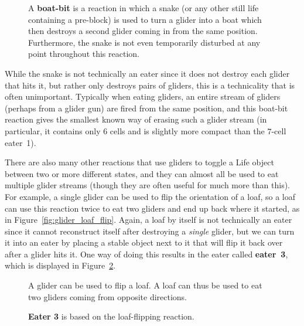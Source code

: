 \begin{figure}[!htb]
	\centering
	\caption{A \textbf{boat-bit} is a reaction in which a snake (or any other still life containing a pre-block) is used to turn a glider into a boat which then destroys a second glider coming in from the same position. Furthermore, the snake is not even temporarily disturbed at any point throughout this reaction.}\label{fig:boat_bit}
\end{figure}

While the snake is not technically an eater since it does not destroy each glider that hits it, but rather only destroys pairs of gliders, this is a technicality that is often unimportant. Typically when eating gliders, an entire stream of gliders (perhaps from a glider gun) are fired from the same position, and this boat-bit reaction gives the smallest known way of erasing such a glider stream (in particular, it contains only $6$ cells and is slightly more compact than the $7$-cell eater~1).

There are also many other reactions that use gliders to toggle a Life object between two or more different states, and they can almost all be used to eat multiple glider streams (though they are often useful for much more than this). For example, a single glider can be used to flip the orientation of a loaf, so a loaf can use this reaction twice to eat two gliders and end up back where it started, as in Figure~\ref{fig:glider_loaf_flip}. Again, a loaf by itself is not technically an eater since it cannot reconstruct itself after destroying a \emph{single} glider, but we can turn it into an eater by placing a stable object next to it that will flip it back over after a glider hits it. One way of doing this results in the eater called \textbf{eater~3}, which is displayed in Figure~\ref{fig:eater_3}.

\begin{figure}[!htb]
	\centering
	\begin{minipage}{.61\textwidth}
		\centering
		\caption{A glider can be used to flip a loaf. A loaf can thus be used to eat two gliders coming from opposite directions.}\label{fig:glider_loaf_flip}
	\end{minipage} \quad %
	\begin{minipage}{.33\textwidth}
		\centering
		\caption{\textbf{Eater 3} is based on the loaf-flipping reaction.}
		\label{fig:eater_3}
	\end{minipage}
\end{figure}

